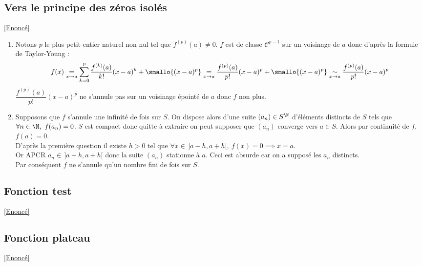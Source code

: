 \documentclass{book}
\begin{document}
	\subsection{Vers le principe des zéros isolés }
	\label{Vers le principe des zéros isolés corrigé}
	\textcolor{blue}{\hyperref[Vers le principe des zéros isolés]{[Enoncé]}}\\
	\begin{enumerate}[leftmargin=*]
		\item Notons $p$ le plus petit entier naturel non nul tel que $f^{(p)}(a)\ne 0$. $f$ est de classe $\mathcal C^{p-1}$ sur un voisinage de $a$ donc d'après la formule de Taylor-Young :
		$$f(x)\underset{x\to a}=\sum_{k=0}^p\frac{f^{(k)}(a)}{k!}(x-a)^k+\smallo{(x-a)^p}\underset{x\to a}=\frac{f^{(p)}(a)}{p!}(x-a)^p+\smallo{(x-a)^p}\underset{x\to a}\sim\frac{f^{(p)}(a)}{p!}(x-a)^p$$
		$\dfrac{f^{(p)}(a)}{p!}(x-a)^p$ ne s'annule pas sur un voisinage épointé de $a$ donc $f$ non plus.
		\item Supposons que $f$ s'annule une infinité de fois sur $S$. On dispose alors d'une suite $(a_n)\in S^\N$ d'éléments distincts de $S$ tels que $\forall n\in \N,\ f(a_n)=0$. $S$ est compact donc quitte à extraire on peut supposer que $(a_n)$ converge vers $a\in S$. Alors par continuité de $f$, $f(a)=0$.\\
		D'après la première question il existe $h>0$ tel que $\forall x\in\, ]a-h,a+h[,\ f(x)=0\implies x=a$.\\
		Or APCR $a_n\in\, ]a-h,a+h[$ donc la suite $(a_n)$ stationne à $a$. Ceci est absurde car on a supposé les $a_n$ distincts.\\
		Par conséquent $f$ ne s'annule qu'un nombre fini de fois sur $S$.
	\end{enumerate}
	
	\subsection{Fonction test}
	\label{Fonction test corrigé}
	\textcolor{blue}{\hyperref[Fonction test]{[Enoncé]}}\\
	
	\subsection{Fonction plateau}
	\label{Fonction plateau corrigé}
	\textcolor{blue}{\hyperref[Fonction plateau]{[Enoncé]}}\\
	
\end{document}
